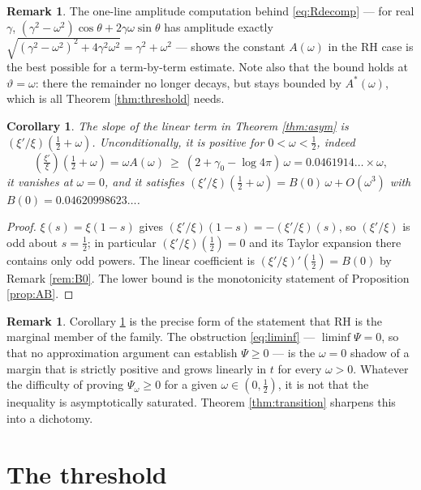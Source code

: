 \documentclass[11pt,reqno]{amsart}
\theoremstyle{plain}
\newtheorem{corollary}[theorem]{Corollary}
\theoremstyle{definition}
\newtheorem{remark}[theorem]{Remark}
\newcommand{\lxi}[1]{\left(\tfrac{\xi'}{\xi}\right)\!#1}
\begin{document}
\begin{remark}
The one-line amplitude computation behind \eqref{eq:Rdecomp} --- for real $\gamma$,
$(\gamma^{2}-\omega^{2})\cos\theta+2\gamma\omega\sin\theta$ has amplitude exactly
$\sqrt{(\gamma^{2}-\omega^{2})^{2}+4\gamma^{2}\omega^{2}}=\gamma^{2}+\omega^{2}$ --- shows the
constant $A(\omega)$ in the RH case is the best possible for a term-by-term estimate. Note also that
the bound holds at $\vartheta=\omega$: there the remainder no longer decays, but stays bounded by
$A^{*}(\omega)$, which is all Theorem \ref{thm:threshold} needs.
\end{remark}

\begin{corollary}\label{cor:margin}
The slope of the linear term in Theorem \ref{thm:asym} is $(\xi'/\xi)(\tfrac12+\omega)$.
Unconditionally, it is positive for $0<\omega<\tfrac12$, indeed
\[
  \lxi{\left(\tfrac12+\omega\right)}=\omega A(\omega)\ \ge\ (2+\gamma_0-\log4\pi)\,\omega
  =0.0461914\ldots\times\omega,
\]
it vanishes at $\omega=0$, and it satisfies
$(\xi'/\xi)(\tfrac12+\omega)=B(0)\,\omega+O(\omega^{3})$ with $B(0)=0.04620998623\ldots$.
\end{corollary}

\begin{proof}
$\xi(s)=\xi(1-s)$ gives $(\xi'/\xi)(1-s)=-(\xi'/\xi)(s)$, so $(\xi'/\xi)$ is odd about
$s=\tfrac12$; in particular $(\xi'/\xi)(\tfrac12)=0$ and its Taylor expansion there contains only
odd powers. The linear coefficient is $(\xi'/\xi)'(\tfrac12)=B(0)$ by Remark \ref{rem:B0}. The
lower bound is the monotonicity statement of Proposition \ref{prop:AB}.
\end{proof}

\begin{remark}
Corollary \ref{cor:margin} is the precise form of the statement that RH is the marginal member of
the family. The obstruction \eqref{eq:liminf} --- $\liminf\Psi=0$, so that no approximation argument
can establish $\Psi\ge0$ --- is the $\omega=0$ shadow of a margin that is strictly positive and
grows linearly in $t$ for every $\omega>0$. Whatever the difficulty of proving
$\Psi_\omega\ge0$ for a given $\omega\in(0,\tfrac12)$, it is not that the inequality is
asymptotically saturated. Theorem \ref{thm:transition} sharpens this into a dichotomy.
\end{remark}

\section{The threshold}\label{sec:threshold}
\end{document}
